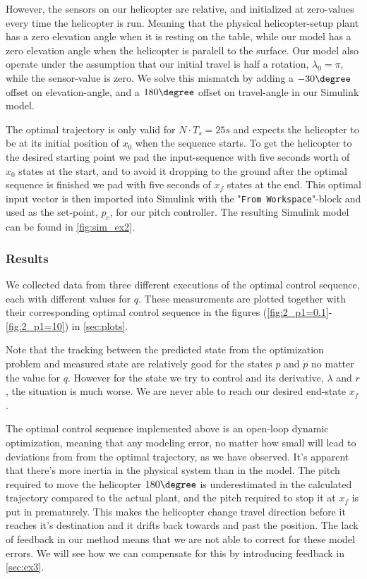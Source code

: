 However, the sensors on our helicopter are relative, and initialized at zero-values every time the helicopter is run. Meaning that the physical helicopter-setup plant has a zero elevation angle when it is resting on the table, while our model has a zero elevation angle when the helicopter is paralell to the surface. Our model also operate under the assumption that our initial travel is half a rotation, $\lambda_0=\pi$, while the sensor-value is zero. We solve this mismatch by adding a $-30\degree$ offset on elevation-angle, and a $180\degree$ offset on travel-angle in our Simulink model.

The optimal trajectory is only valid for $N\cdot T_s=25s$ and expects the helicopter to be at its initial position of $x_0$ when the sequence starts. To get the helicopter to the desired starting point we pad the input-sequence with five seconds worth of $x_0$ states at the start, and to avoid it dropping to the ground after the optimal sequence is finished we pad with five seconds of $x_f$ states at the end. This optimal input vector is then imported into Simulink with the "\texttt{From Workspace}"-block and used as the set-point, $p_c$, for our pitch controller. The resulting Simulink model can be found in \cref{fig:sim_ex2}.

\subsubsection{Results}
We collected data from three different executions of the optimal control sequence, each with different values for $q$. These measurements are plotted together with their corresponding optimal control sequence in the figures (\ref{fig:2_p1=0.1}-\ref{fig:2_p1=10}) in \cref{sec:plots}.

Note that the tracking between the predicted state from the optimization problem and measured state are relatively good for the states $p$ and $\dot{p}$ no matter the value for $q$. However for the state we try to control and its derivative, $\lambda$ and $r$, the situation is much worse. We are never able to reach our desired end-state $x_f$.

The optimal control sequence implemented above is an open-loop dynamic optimization, meaning that any modeling error, no matter how small will lead to deviations from from the optimal trajectory, as we have observed. It's apparent that there's more inertia in the physical system than in the model. The pitch required to move the helicopter $180\degree$ is underestimated in the calculated trajectory compared to the actual plant, and the pitch required to stop it at $x_f$ is put in prematurely. This makes the helicopter change travel direction before it reaches it's destination and it drifts back towards and past the position. The lack of feedback in our method means that we are not able to correct for these model errors. We will see how we can compensate for this by introducing feedback in \cref{sec:ex3}.
















